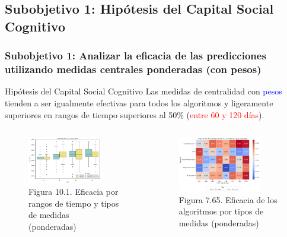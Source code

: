 \documentclass{beamer}
\begin{document}
\subsection{Subobjetivo 1: Hipótesis del Capital Social Cognitivo}


\begin{frame}
	\frametitle{Subobjetivo 1: Analizar la eficacia de las predicciones utilizando medidas centrales ponderadas (con pesos)}
	\begin{block}{Hipótesis del Capital Social Cognitivo}
		Las medidas de centralidad con \textcolor{blue}{pesos} tienden a ser igualmente efectivas para todos los algoritmos y ligeramente superiores en rangos de tiempo superiores al 50\% (\textcolor{red}{entre 60 y 120 días}).
	\end{block}
	\begin{columns}[c]
		\begin{column}{.5\textwidth}
			\begin{figure}
				\centering
				\includegraphics[width=0.8\textwidth]{figs/cap7/figura_29}
				\caption{Figura 10.1.  Eficacia por rangos de tiempo y tipos de medidas (ponderadas)}
			\end{figure}      
		\end{column}
		\begin{column}{.5\textwidth}
			\begin{figure}
				\centering
				\includegraphics[width=0.8\textwidth]{figs/cap7/figura_73}
				\caption{Figura 7.65. Eficacia de los algoritmos por tipos de medidas (ponderadas)}
				

\end{figure}
\end{column}
\end{columns}
\end{frame}
\end{document}
